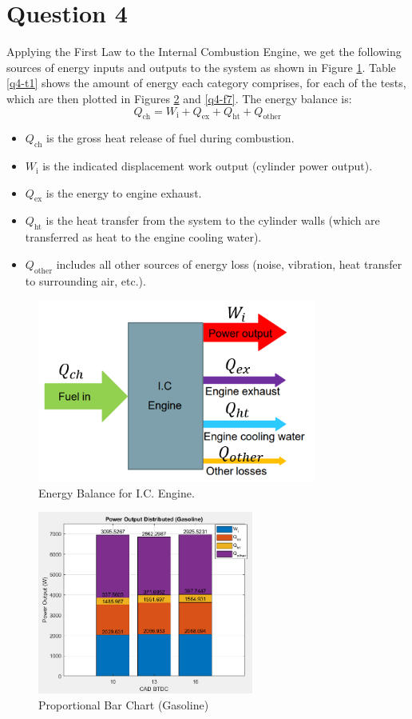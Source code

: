 \documentclass[11pt]{article}
\begin{document}
\section{Question 4}
Applying the First Law to the Internal Combustion Engine, we get the following sources of energy inputs and outputs to the system as shown in Figure \ref{q4-f1}. Table \ref{q4-t1} shows the amount of energy each category comprises, for each of the tests, which are then plotted in Figures \ref{q4-f6} and \ref{q4-f7}. The energy balance is:
\begin{equation}
	Q_\textrm{ch} = W_\textrm{i} + Q_\textrm{ex} + Q_\textrm{ht} + Q_\textrm{other}\label{q4-1}
\end{equation}
\begin{itemize}
	\item $Q_\textrm{ch}$ is the gross heat release of fuel during combustion.
	\item $W_\textrm{i}$ is the indicated displacement work output (cylinder power output).
	\item $Q_\textrm{ex}$ is the energy to engine exhaust.
	\item $Q_\textrm{ht}$ is the heat transfer from the system to the cylinder walls (which are transferred as heat to the engine cooling water).
	\item $Q_\textrm{other}$ includes all other sources of energy loss (noise, vibration, heat transfer to surrounding air, etc.).
\end{itemize}
\begin{figure}[H]
	\centering
    \includegraphics[height = 6cm]{./img/diagram16.png}
    \caption{Energy Balance for I.C. Engine. \cite{r0}}
    \label{q4-f1}
\end{figure}
\begin{figure}[H]
	\centering
    \includegraphics[height = 6cm]{./img/diagram21.png}
    \caption{Proportional Bar Chart (Gasoline)}
    \label{q4-f6}
\end{figure}
\end{document}

